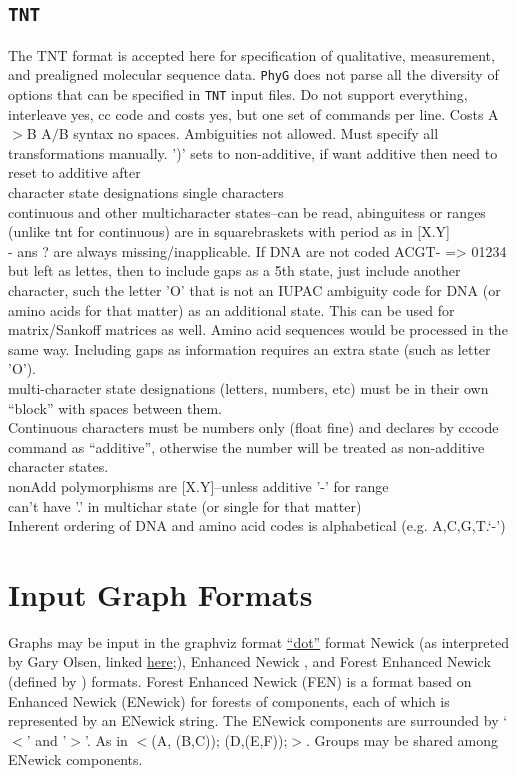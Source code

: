 \documentclass[11pt]{article}
\begin{document}
		\subsection{\texttt{TNT}}
		The TNT \citep{Goloboffetal2008} format is accepted here for specification of qualitative,
		 measurement, and prealigned molecular sequence data.  \texttt{PhyG} does not parse all the
		  diversity of options that can be specified in \texttt{TNT} input files.
		Do not support everything, interleave yes, cc code and costs yes, but one set of commands per line.
		Costs A$>$B A$/$B syntax no spaces. Ambiguities not allowed.  Must specify all transformations manually.
		')' sets to non-additive, if want additive then need to reset to additive after\\
		character state designations single characters\\
		continuous and other multicharacter states--can be read, abinguitess or ranges (unlike tnt for continuous) are 
		in squarebraskets with period as in [X.Y]\\
		- ans ? are always missing/inapplicable.  If DNA are not coded ACGT- => 01234 but left as lettes,
		then to include gaps as a 5th state, just include another character, such the letter 'O' that is not an IUPAC ambiguity code for DNA (or amino acids for that matter) as an additional state.  This can be used for matrix/Sankoff matrices as well.
		Amino acid sequences would be processed in the same way.  Including gaps as information requires
		an extra state (such as letter 'O').\\ 
		multi-character state designations (letters, numbers, etc) must be in their own ``block'' with spaces 
		between them.\\
		Continuous characters must be numbers only (float fine) and declares by cccode command as 
		``additive'', otherwise the number will be treated as non-additive character states. \\
		nonAdd polymorphisms  are [X.Y]--unless  additive '-' for range\\
		can't have '.' in multichar state (or single for that matter)\\
		Inherent ordering of DNA and amino acid codes is alphabetical (e.g. A,C,G,T.`-')
	
	\section{Input Graph Formats}
	Graphs may be input in the graphviz format \href{https://graphviz.org/}{``dot''} format Newick (as interpreted by Gary Olsen, linked \href{https://evolution.genetics.washington.edu/phylip/newick_doc.html}{here};), Enhanced Newick \cite{Cardonaetal2008},
	and Forest Enhanced Newick (defined by \citealp{WheelerPhyloSuperGraphs}) formats.
	Forest Enhanced Newick (FEN) is a format based on Enhanced Newick (ENewick) for 
	forests of components, each of which is represented by an ENewick string.  The ENewick 
	components are surrounded by `$<$' and '$>$'. As in $<$(A, (B,C)); (D,(E,F));$>$.  
	Groups may be shared among ENewick components.
	
\end{document}
